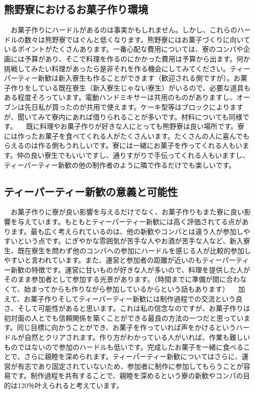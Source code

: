 \subsection{熊野寮におけるお菓子作り環境}
　お菓子作りにハードルがあるのは事実かもしれません。しかし、これらのハードルの数々は熊野寮ではぐんと低くなります。熊野寮にはお菓子づくりに向いているポイントがたくさんあります。一番心配な費用については、寮のコンパや企画には予算があり、そこで料理を作るのにかかった費用は予算から出ます。何か挑戦してみたい料理があったら是非それを作る機会にしてみてください。ティーパーティー新歓は新入寮生も作ることができます（歓迎される側ですが）。お菓子作りをしている既在寮生（新入寮生じゃない寮生）がいるので、必要な道具もある程度そろっています。電動ハンドミキサーは共用のものがありますし、オーブンは先日私が買ったのが共用で使えます。ケーキ型等はブロックによりますが、聞いてみて寮内にあれば借りられることが多いです。材料についても同様です。
　既に料理やお菓子作りが好きな人にとっても熊野寮は良い場所です。寮には作ったお菓子を食べてくれる人がたくさんいます。たくさんの人に喜んでもらえるのは作る側もうれしいです。寮には一緒にお菓子を作ってくれる人もいます。仲の良い寮生でもいいですし、通りすがりで手伝ってくれる人もいますし、ティーパーティー新歓の他の制作者のように隣で作るだけでも楽しいです。

\subsection{ティーパーティー新歓の意義と可能性}
　お菓子作りに寮が良い影響を与えるだけでなく、お菓子作りもまた寮に良い影響を与えています。もともとティーパーティー新歓には高く評価されてる点があります。最も広く考えられているのは、他の新歓やコンパとは違う人が参加しやすいという点です。にぎやかな雰囲気が苦手な人やお酒が苦手な人など、新入寮生、既在寮生を問わず他のコンパへの参加にハードルを感じる人が比較的参加しやすいと言われています。また、運営と参加者の距離が近いのもティーパーティー新歓の特徴です。運営に甘いものが好きな人が多いので、料理を提供した人がそのまま参加者として参加する光景があります。（時間までに準備が間に合わなくて、始まってからも作りながら参加しているからという話もあります）
　加えて、お菓子作りそしてティーパーティー新歓には制作過程での交流という良さ、そして可能性があると思います。これは私の信念なのですが、お菓子作りは初対面の人とでも信頼関係を築くことができる最良の方法の一つだと思っています。同じ目標に向かうことができ、お菓子を作っていれば声をかけるというハードルが自然とクリアされます。作り方がわかっている人がいれば、作業も難しいものではないので参加のハードルも低いです。完成したお菓子を一緒に食べることで、さらに親睦を深められます。ティーパーティー新歓についてはさらに、運営が有志であり固定されていないため、参加者に制作に参加してもらうことが容易です。制作過程を共有することで、親睦を深めるという寮の新歓やコンパの目的は120％叶えられると考えています。

